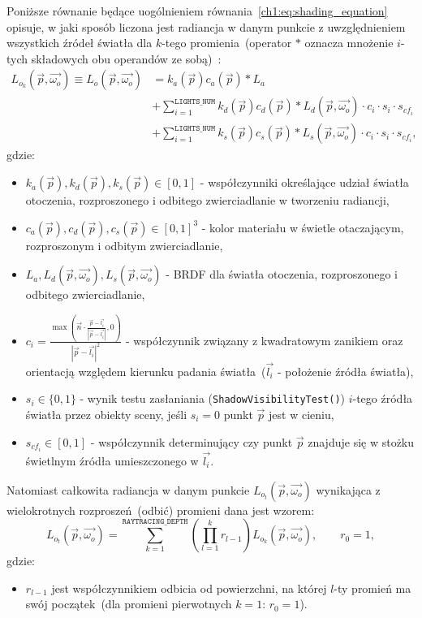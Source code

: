 \begin{enumerate}
Poniższe równanie będące uogólnieniem równania~\eqref{ch1:eq:shading_equation} opisuje, w jaki sposób liczona jest radiancja w danym punkcie z uwzględnieniem wszystkich źródeł światła dla $k$-tego promienia~(operator $*$ oznacza mnożenie $i$-tych składowych obu operandów ze sobą)~\cite{RTFTGU}:
\begin{align}
\label{ch3:eq:shading_equation_general}
L_{o_k}(\vec{p}, \vec{\omega_o}) \equiv L_o(\vec{p}, \vec{\omega_o}) &= k_a(\vec{p})c_a(\vec{p}) * L_a\nonumber\\
&+ \sum_{i=1}^{\mathtt{LIGHTS\_NUM}} k_d(\vec{p})c_d(\vec{p}) * L_d(\vec{p}, \vec{\omega_o}) \cdot c_i\cdot s_i\cdot s_{cf_i} \nonumber\\
&+ \sum_{i=1}^{\mathtt{LIGHTS\_NUM}} k_s(\vec{p})c_s(\vec{p}) * L_s(\vec{p}, \vec{\omega_o}) \cdot c_i\cdot s_i\cdot s_{cf_i},
\end{align}
gdzie:
\begin{itemize}
\item $k_a(\vec{p}), k_d(\vec{p}), k_s(\vec{p}) \in [0, 1]$ - współczynniki określające udział światła otoczenia, rozproszonego i odbitego zwierciadlanie w tworzeniu radiancji,
\item $c_a(\vec{p}), c_d(\vec{p}), c_s(\vec{p}) \in [0, 1]^3$ - kolor materiału w świetle otaczającym, rozproszonym i odbitym zwierciadlanie,
\item $L_a, L_d(\vec{p}, \vec{\omega_o}), L_s(\vec{p}, \vec{\omega_o})$ - BRDF dla światła otoczenia, rozproszonego i odbitego zwierciadlanie,
\item $c_i = \frac{\max\left(\vec{n} \cdot \frac{\vec{p} - \vec{l_i}}{|\vec{p} - \vec{l_i}|}  , 0\right)}{|\vec{p} - \vec{l_i}|^2} $ - współczynnik związany z kwadratowym zanikiem oraz orientacją względem kierunku padania światła~($\vec{l_i}$ - położenie źródła światła),
\item $s_i\in\lbrace 0, 1 \rbrace$ - wynik testu zasłaniania (\texttt{ShadowVisibilityTest()}) $i$-tego źródła światła przez obiekty sceny, jeśli $s_i=0$ punkt $\vec{p}$ jest w cieniu,
\item $s_{cf_i}\in[0, 1]$ - współczynnik determinujący czy punkt $\vec{p}$ znajduje się w stożku świetlnym źródła umieszczonego w $\vec{l_i}$.
\end{itemize}

Natomiast całkowita radiancja w danym punkcie $L_{o_t}(\vec{p}, \vec{\omega_o})$ wynikająca z wielokrotnych rozproszeń~(odbić) promieni dana jest wzorem:
\begin{equation}
L_{o_t}(\vec{p}, \vec{\omega_o}) = \sum_{k=1}^{\mathtt{RAYTRACING\_DEPTH}}\left(\prod_{l=1}^k r_{l-1} \right)L_{o_k}(\vec{p}, \vec{\omega_o}), \qquad r_0 = 1,
\label{ch3:eq:total_radiance}
\end{equation}
gdzie:
\begin{itemize}
\item[] $r_{l-1}$ jest współczynnikiem odbicia od powierzchni, na której $l$-ty promień ma swój początek~(dla promieni pierwotnych $k=1$: $r_0=1$). 
\end{itemize}


\end{enumerate}
